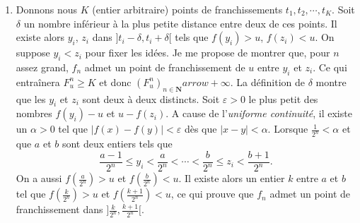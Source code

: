 \begin{enumerate}
\begin{enumerate}
    \item Soit $i\in \{ 1,\cdots ,F_{u}\} $ $I_{i}$ l'intervalle d{\'e}fini dans la question pr{\'e}c{\'e}dente.
Comme $t_{i}$ est un point de franchissement, il existe $\theta _{1}$ et $\theta_{2}$ dans $I_{i}$ tels que $f(\theta _{1})>u$ et $f(\theta_{2})<u$.
Comme $f$ est continue en $\theta _{1}$, il existe $J_{i}$ assez petit pour {\^e}tre inclus dans $I_{i} $ et pour que $f-u$ reste strictement positive dans $J_{i}$.
De m{\^e}me, l'existence de $K_{i}$ est assur{\'e}e par la continuit{\'e} de $f$ en $\theta _{2}$.

    \item Lorsque $2^{-n}$ est plus petit que la plus petite longueur des intervalles $J_{i}$ et $K_{i}$ de la question pr{\'e}c{\'e}dente, chaque point de franchissement se trouve dans
un seul des intervalles de la subdivision associ{\'e}e {\`a} $f_{n}$, chacun de ces intervalles contient
exactement un des points de franchissement donc $F_{u}^{n}=F_{u}$.
La suite $(F_{u}^{n})_{n\in \mathbf{N}}$ est stationnaire de valeur $F_{u}$.
  \end{enumerate}

  \item Donnons nous $K$ (entier arbitraire) points de franchissements $t_{1},t_{2},\cdots ,t_{K}$.
Soit $\delta $ un nombre inf{\'e}rieur {\`a} la plus petite distance entre deux de ces points.
Il existe alors $y_{i}$, $z_{i}$ dans $] t_{i}-\delta ,t_{i}+\delta [ $ tels que $f(y_{i})>u$, $f(z_{i})<u$.
On suppose $y_{i}<z_{i}$ pour fixer les id{\'e}es.
Je me propose de montrer que, pour $n$ assez grand, $f_{n}$ admet un point de franchissement de $u$ entre $y_{i}$ et $z_{i}$.
Ce qui entra\^{i}nera $F_{u}^{n}\geq K$ et donc $(F_{u}^{n})_{n\in \mathbf{N}}arrow +\infty $.\newline
La d{\'e}finition de $\delta $ montre que les $y_{i}$ et $z_{i}$ sont deux {\`a} deux distincts.
Soit $\varepsilon >0$ le plus petit des nombres $f(y_{i})-u$ et $u-f(z_{i})$. A cause de l'\emph{uniforme continuit{\'e}}, il existe un $\alpha >0$ tel que
$| f(x)-f(y)| <\varepsilon $ d{\`e}s que $| x-y| <\alpha $.\newline
Lorsque $\frac{1}{2^{n}}<\alpha $ et que $a$ et $b$ sont deux entiers tels que
\[
\frac{a-1}{2^{n}}\leq y_{i}<\frac{a}{2^{n}}<\cdots
<\frac{b}{2^{n}}\leq z_{i}<\frac{b+1}{2^{n}}.
\]
On a aussi $f(\frac{a}{2^{n}})>u$ et $f(\frac{b}{2^{n}})<u$.
Il existe alors un entier $k$ entre $a$ et $b$ tel que $f(\frac{k}{2^{n}})>u$ et $f(\frac{k+1}{2^{n}})<u$, ce qui prouve que $f_{n}$ admet un point de
franchissement dans $] \frac{k}{2^{n}},\frac{k+1}{2^{n}}[ $.


\end{enumerate}
